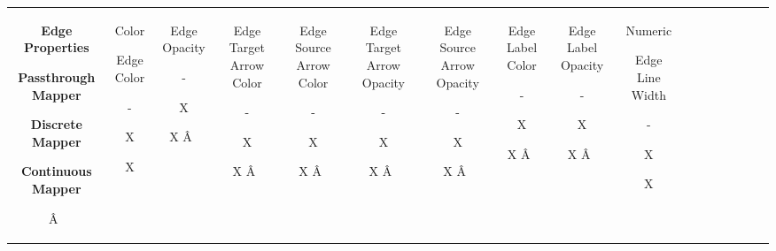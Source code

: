 \begin{tabular}{|c|c|c|c|c|c|c|c|c|c|c|c|c|c|c|c|c|}
\hline 
 & & & & & & & & & & & & & & & & \\
 \hline 


 \textbf{Edge Properties}



 \textbf{Passthrough Mapper}



 \textbf{Discrete Mapper}



 \textbf{Continuous Mapper}

\^A  &

 Color


 Edge Color 


 - 


 X 


 X 
 &

 Edge Opacity 


 - 


 X 


 X 
\^A  &

 Edge Target Arrow Color 


 - 


 X 


 X 
\^A  &

 Edge Source Arrow Color 


 - 


 X 


 X 
\^A  &

 Edge Target Arrow Opacity 


 - 


 X 


 X 
\^A  &

 Edge Source Arrow Opacity 


 - 


 X 


 X 
\^A  &

 Edge Label Color 


 - 


 X 


 X 
\^A  &

 Edge Label Opacity 


 - 


 X 


 X 
\^A  &

 Numeric


  Edge Line Width 


 - 


 X 


 X 
 &


\end{tabular}
